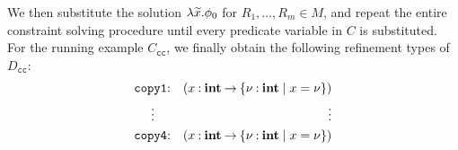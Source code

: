 We then substitute the solution \(\lambda \widetilde{x}.\phi_0\) for 
\(R_1,\dots,R_m \in M\), and repeat the entire constraint solving 
procedure until every predicate variable in \(C\) is substituted.  For 
the running example \(C_{\texttt{cc}}\), we finally obtain the following 
refinement types of \(D_{\texttt{cc}}\):
\begin{eqnarray*}
\texttt{copy1}&\mathbin{:}&(x\mathbin{:}{\mathbf{int}}\mathbin{\rightarrow}{\{{\nu\mathbin{:}\mathbf{int} \mid x=\nu}\}}) \\
\vdots\quad &&\qquad\qquad \vdots \\
\texttt{copy4}&\mathbin{:}&(x\mathbin{:}{\mathbf{int}}\mathbin{\rightarrow}{\{{\nu\mathbin{:}\mathbf{int} \mid x=\nu}\}})
\end{eqnarray*}


%
